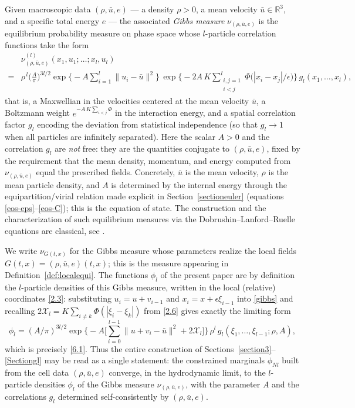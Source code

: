 \documentclass[11pt]{article}
\begin{document}
Given macroscopic data
$(\rho,\bar u,e)$ --- a density $\rho>0$, a mean velocity $\bar u\in\mathbb R^3$,
and a specific total energy $e$ --- the associated \emph{Gibbs measure}
$\nu_{(\rho,\bar u,e)}$ is the equilibrium probability measure on phase space
whose $l$-particle correlation functions take the form
\begin{align*}
&\nu^{(l)}_{(\rho,\bar u,e)}(x_1,u_1;\dots;x_l,u_l)
\\=&
\rho^{\,l}\Big(\tfrac{A}{\pi}\Big)^{3l/2}
\exp\!\Big\{-A\!\sum_{i=1}^{l}\|u_i-\bar u\|^2\Big\}\,
\exp\!\Big\{-2A\,K\!\!\sum_{\substack{i,j=1\\ i< j}}^{l}\Phi\big(|x_i-x_j|/\epsilon\big)\Big\}\,
g_l(x_1,\dots,x_l),\label{gibbs}\tag{1.9}
\end{align*}
that is, a Maxwellian in the velocities centered at the mean velocity $\bar u$,
a Boltzmann weight $e^{-A\,K\sum_{i<j}\Phi}$ in the interaction energy, and a
spatial correlation factor $g_l$ encoding the deviation from statistical
independence (so that $g_l\to1$ when all particles are infinitely separated).
Here the scalar $A>0$ and the correlation $g_l$ are \emph{not} free: they are
the quantities conjugate to $(\rho,\bar u,e)$, fixed by the requirement that the
mean density, momentum, and energy computed from $\nu_{(\rho,\bar u,e)}$ equal
the prescribed fields. Concretely, $\bar u$ is the mean velocity, $\rho$ is the
mean particle density, and $A$ is determined by the internal energy through the
equipartition/virial relation made explicit in Section~\ref{sectioneuler}
(equations \eqref{eos-eps}--\eqref{eos-C}); this is the equation of state. The
construction and the characterization of such equilibrium measures via the
Dobrushin--Lanford--Ruelle equations are classical, see
\cite{Ruelle1969,BornGreen1949}.

We write $\nu_{G(t,x)}$ for the Gibbs measure whose parameters realize the local
fields $G(t,x)=(\rho,\bar u,e)(t,x)$; this is the measure appearing in
Definition~\ref{def:localequi}. The functions $\phi_l$ of the present paper are by
definition the $l$-particle densities of this Gibbs measure, written in the
local (relative) coordinates \eqref{2.3}: substituting $u_i=u+v_{i-1}$ and
$x_i=x+\epsilon\xi_{i-1}$ into \eqref{gibbs} and recalling
$2\mathcal X_l=K\sum_{i\neq k}\Phi(|\xi_i-\xi_k|)$ from \eqref{2.6} gives exactly
the limiting form
\[
\phi_l=(A/\pi)^{3l/2}\exp\!\Big\{-A\Big[\textstyle\sum_{i=0}^{l-1}\|u+v_i-\bar u\|^2+2\mathcal X_l\Big]\Big\}\,
\rho^l\,g_l(\xi_1,\dots,\xi_{l-1};\rho,A),
\]
which is precisely \eqref{6.1}. Thus the entire construction of
Sections~\ref{section3}--\ref{Sectiongl} may be read as a single statement: the
constrained marginals $\phi_{Nl}$ built from the cell data $(\rho,\bar u,e)$
converge, in the hydrodynamic limit, to the $l$-particle densities $\phi_l$ of
the Gibbs measure $\nu_{(\rho,\bar u,e)}$, with the parameter $A$ and the
correlations $g_l$ determined self-consistently by $(\rho,\bar u,e)$.
\end{document}

